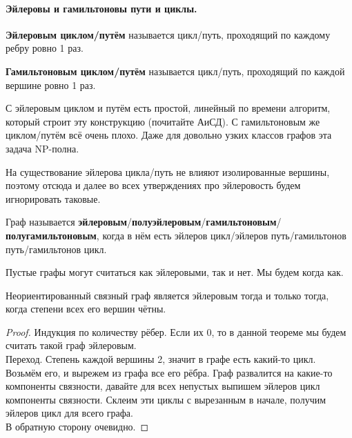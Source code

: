 \documentclass{article}
\begin{document}
    \paragraph{Эйлеровы и гамильтоновы пути и циклы.}
    \begin{definition}
        \textbf{Эйлеровым циклом/путём} называется цикл/путь, проходящий по каждому ребру ровно 1 раз.
    \end{definition}
    \begin{definition}
        \textbf{Гамильтоновым циклом/путём} называется цикл/путь, проходящий по каждой вершине ровно 1 раз.
    \end{definition}
    \begin{remark}
        С эйлеровым циклом и путём есть простой, линейный по времени алгоритм, который строит эту конструкцию (почитайте АиСД). С гамильтоновым же циклом/путём всё очень плохо. Даже для довольно узких классов графов эта задача NP-полна.
    \end{remark}
    \begin{remark}
        На существование эйлерова цикла/путь не влияют изолированные вершины, поэтому отсюда и далее во всех утверждениях про эйлеровость будем игнорировать таковые.
    \end{remark}
    \begin{definition}
        Граф называется \textbf{эйлеровым}/\textbf{полуэйлеровым}/\textbf{гамильтоновым}/\textbf{полугамильтоновым}, когда в нём есть эйлеров цикл/эйлеров путь/гамильтонов путь/гамильтонов цикл.
    \end{definition}
    \begin{remark}
        Пустые графы могут считаться как эйлеровыми, так и нет. Мы будем когда как.
    \end{remark}
    \begin{theorem}
        Неориентированный связный граф является эйлеровым тогда и только тогда, когда степени всех его вершин чётны.
    \end{theorem}
    \begin{proof}
        Индукция по количеству рёбер. Если их 0, то в данной теореме мы будем считать такой граф эйлеровым.\\
        Переход. Степень каждой вершины 2, значит в графе есть какий-то цикл. Возьмём его, и вырежем из графа все его рёбра. Граф развалится на какие-то компоненты связности, давайте для всех непустых выпишем эйлеров цикл компоненты связности. Склеим эти циклы с вырезанным в начале, получим эйлеров цикл для всего графа.\\
        В обратную сторону очевидно.
    \end{proof}
\end{document}
